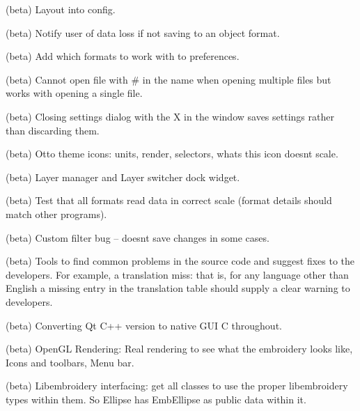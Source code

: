 \begin{DoxyRefList}
\label{todo__todo000359}%
%
(beta) Layout into config.

\label{todo__todo000360}%
%
(beta) Notify user of data loss if not saving to an object format.

\label{todo__todo000361}%
%
(beta) Add which formats to work with to preferences.

\label{todo__todo000362}%
%
(beta) Cannot open file with {\ttfamily \#} in the name when opening multiple files but works with opening a single file.

\label{todo__todo000363}%
%
(beta) Closing settings dialog with the X in the window saves settings rather than discarding them.

\label{todo__todo000364}%
%
(beta) Otto theme icons\+: units, render, selectors, what\textquotesingle{}s this icon doesn\textquotesingle{}t scale.

\label{todo__todo000365}%
%
(beta) Layer manager and Layer switcher dock widget.

\label{todo__todo000366}%
%
(beta) Test that all formats read data in correct scale (format details should match other programs).

\label{todo__todo000367}%
%
(beta) Custom filter bug -- doesn\textquotesingle{}t save changes in some cases.

\label{todo__todo000368}%
%
(beta) Tools to find common problems in the source code and suggest fixes to the developers. For example, a translation miss\+: that is, for any language other than English a missing entry in the translation table should supply a clear warning to developers.

\label{todo__todo000369}%
%
(beta) Converting Qt C++ version to native GUI C throughout.

\label{todo__todo000370}%
%
(beta) Open\+GL Rendering\+: {\ttfamily Real} rendering to see what the embroidery looks like, Icons and toolbars, Menu bar.

\label{todo__todo000371}%
%
(beta) Libembroidery interfacing\+: get all classes to use the proper libembroidery types within them. So {\ttfamily Ellipse} has {\ttfamily Emb\+Ellipse} as public data within it.


\end{DoxyRefList}
